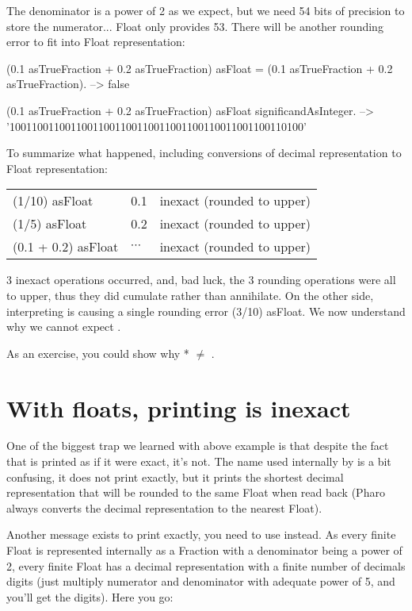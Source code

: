 \documentclass[a4paper,10pt,twoside]{book}
\begin{document}
The denominator is a power of 2 as we expect, but we need 54 bits of precision to store the numerator... Float only provides 53. There will be another rounding error to fit into Float representation:

\begin{code}{}
(0.1 asTrueFraction + 0.2 asTrueFraction) asFloat = (0.1 asTrueFraction + 0.2 asTrueFraction).
	--> false
	
(0.1 asTrueFraction + 0.2 asTrueFraction) asFloat significandAsInteger.
	--> '10011001100110011001100110011001100110011001100110100'
\end{code}

To summarize what happened, including conversions of decimal representation to Float representation:\\
\begin{tabular}{lll}
(1/10) asFloat & 0.1 & inexact (rounded to upper) \\
(1/5) asFloat & 0.2 & inexact (rounded to upper) \\
(0.1 + 0.2) asFloat & $\cdots$ & inexact (rounded to upper)  \\
\end{tabular}

3 inexact operations occurred, and, bad luck, the 3 rounding operations were all to upper, thus they did cumulate rather than annihilate.
On the other side, interpreting  is causing a single rounding error (3/10) asFloat.
We now understand why we cannot expect .

As an exercise, you could show why  *   $\neq$ .


\section{With floats, printing is inexact}

One of the biggest trap we learned with above example is that despite the fact that  is printed  as if it were exact, it's not.
The name  used internally by  is a bit confusing, it does not print exactly,
but it prints the shortest decimal representation that will be rounded
to the same Float when read back (Pharo always converts the decimal representation to the nearest Float).

Another message exists to print exactly, you need to use  instead.
As every finite Float is  represented internally as a Fraction with a
denominator being a power of 2, every finite Float has a decimal
representation with a finite number of decimals digits (just multiply
numerator and denominator with adequate power of 5, and you'll get the
digits). Here you go:
\end{document}
